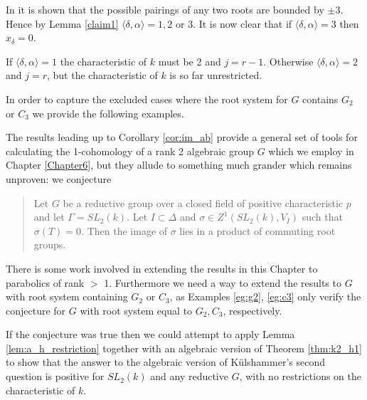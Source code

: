 In \cite[\S 3.4]{carter1989simple} it is shown that the possible pairings of any two roots are bounded by $\pm 3$. Hence by Lemma \ref{claim1} $\langle \delta, \alpha \rangle = 1, 2$ or 3. It is now clear that if $\langle \delta, \alpha \rangle = 3$ then $x_\delta = 0$.

If $\langle \delta, \alpha \rangle = 1$ the characteristic of $k$ must be 2 and $j = r-1$. Otherwise $\langle \delta, \alpha \rangle = 2$ and $j = r$, but the characteristic of $k$ is so far unrestricted.

In order to capture the excluded cases where the root system for $G$ contains $G_2$ or $C_3$ we provide the following examples.

The results leading up to Corollary \ref{cor:im_ab} provide a general set of tools for calculating the 1-cohomology of a rank 2 algebraic group $G$ which we employ in Chapter \ref{Chapter6}, but they allude to something much grander which remains unproven: we conjecture
\begin{quote}
	Let $G$ be a reductive group over a closed field of positive characteristic $p$ and let $\Gamma = SL_2(k)$. Let $I \subset \Delta$ and $\sigma \in Z^1(SL_2(k), V_I)$ such that $\sigma(T)  = 0$. Then the image of $\sigma$ lies in a product of commuting root groups.
	\label{conj:im_ab}
\end{quote}

There is some work involved in extending the results in this Chapter to parabolics of rank $>$ 1. Furthermore we need a way to extend the results to $G$ with root system containing $G_2$ or $C_3$, as Examples \ref{eg:g2}, \ref{eg:c3} only verify the conjecture for $G$ with root system equal to $G_2, C_3$, respectively.

If the conjecture was true then we could attempt to apply Lemma \ref{lem:a_h_restriction} together with an algebraic version of Theorem \ref{thm:k2_h1} to show that the answer to the algebraic version of K\"ulshammer's second question is positive for $SL_2(k)$ and any reductive $G$, with no restrictions on the characteristic of $k$.


